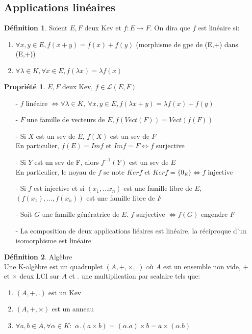 \documentclass[fleqn]{article}
\theoremstyle{definition} \newtheorem*{defi}{D\'efinition}
\theoremstyle{definition} \newtheorem*{theo}{Th\'eor\`eme}
\theoremstyle{definition} \newtheorem*{coro}{Corollaire}
\theoremstyle{definition} \newtheorem*{nota}{Notation}
\theoremstyle{remark} \newtheorem*{rqs}{Remarques}
\theoremstyle{definition} \newtheorem*{prop}{Propri\'et\'e}
\begin{document}
\subsection{Applications lin\'eaires}
\begin{defi} Soient $E,F$ deux Kev et $f: E \rightarrow F$. On dira que $f$ est lin\'eaire si:
	\begin{enumerate}
		\item $\forall x,y \in E, f(x+y) = f(x) + f(y)$ (morphisme de gpe de (E,+) dans (E,+))
		\item $\forall \lambda \in K, \forall x \in E, f(\lambda x) = \lambda f(x)$
	\end{enumerate}
\end{defi}

\begin{prop} $E,F$ deux Kev, $f \in \mathscr{L}(E,F)$
	\begin{itemize}
		\item [-] $f$ lin\'eaire $\Leftrightarrow \forall \lambda \in K,\ \forall x,y \in E, f(\lambda x + y) = \lambda f(x) + f(y)$
		\item [-] $F$ une famille de vecteurs de $E, f(Vect(F)) = Vect(f(F))$
		\item [-] Si $X$ est un sev de $E$, $f(X)$ est un sev de $F$ \\
			En particulier, $f(E) = Im f$ et $Im f = F \Leftrightarrow f$ surjective
		\item [-] Si $Y$ est un sev de F, alors $f^{-1}(Y)$ est un sev de $E$\\
			En particulier, le noyau de $f$ se note $Ker f$ et $Ker f = \{0_E\} \Leftrightarrow f$ injective
		\item [-] Si $f$ est injective et si $(x_1, \hdots x_n)$ est une famille libre de $E$, $(f(x_1), \hdots, f(x_n))$ est une famille libre
			de $F$
		\item [-] Soit $G$ une famille g\'en\'eratrice de $E$. $f$ surjective $\Leftrightarrow f(G)$ engendre $F$
		\item [-] La composition de deux applications li\'eaires est lin\'eaire, la r\'eciproque d'un isomorphisme est lin\'eaire
	\end{itemize}
\end{prop}

\begin{defi} Alg\`ebre\\
	Une K-alg\`ebre est un quadruplet $(A,+,\times, .)$ o\`u $A$ est un ensemble non vide, $+$ et $\times$ deux LCI sur $A$ et $.$ une
	multiplication par scalaire tels que:
	\begin{enumerate}
		\item $(A, + , .)$ est un Kev
		\item $(A, +, \times)$ est un anneau
		\item $\forall a, b \in A, \forall \alpha \in K:$ $\alpha . (a\times b) = (\alpha . a) \times b = a \times (\alpha . b)$
	\end{enumerate}
\end{defi}
\end{document}
